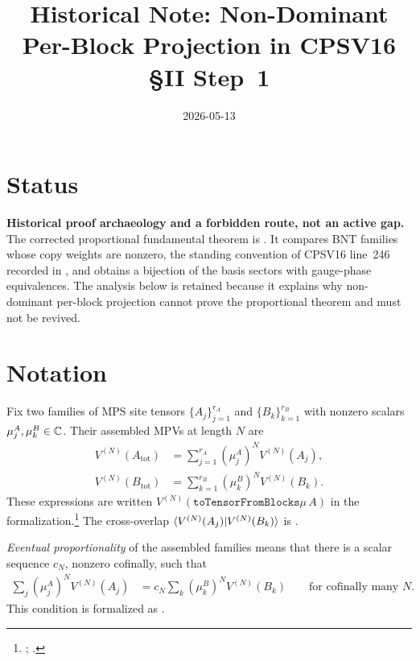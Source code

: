 \documentclass{article}
\title{Historical Note: Non-Dominant Per-Block Projection in CPSV16 \S II Step~1}
\author{}
\date{2026-05-13}
\begin{document}
\maketitle
{}

\section{Status}

\textbf{Historical proof archaeology and a forbidden route, not an active gap.}
The corrected proportional fundamental theorem is
. It compares
BNT families whose copy weights are nonzero, the standing convention of
CPSV16 line~246 recorded in
, and obtains a
bijection of the basis sectors with gauge-phase equivalences. The analysis
below is retained because it explains why non-dominant per-block projection
cannot prove the proportional theorem and must not be revived.

\section{Notation}

Fix two families of MPS site tensors $\{A_j\}_{j=1}^{r_A}$ and
$\{B_k\}_{k=1}^{r_B}$ with nonzero scalars
$\mu^A_j,\mu^B_k\in\mathbb{C}$. Their assembled MPVs at length $N$ are
\begin{align}
    V^{(N)}(A_{\mathrm{tot}})
        &=\sum_{j=1}^{r_A}(\mu^A_j)^N V^{(N)}(A_j),
    \label{eq:nondominant_A_assembled_mpv}\\
    V^{(N)}(B_{\mathrm{tot}})
        &=\sum_{k=1}^{r_B}(\mu^B_k)^N V^{(N)}(B_k).
    \label{eq:nondominant_B_assembled_mpv}
\end{align}
These expressions are written
$V^{(N)}(\mathtt{toTensorFromBlocks} \mu\,A)$ in the
formalization.\footnote{%
    ;
    .}
The cross-overlap
$\langle V^{(N)}(A_j) | V^{(N)}(B_k) \rangle$ is
.

\emph{Eventual proportionality} of the assembled families means that there is
a scalar sequence $c_N$, nonzero cofinally, such that
\begin{align}
    \sum_j(\mu^A_j)^N V^{(N)}(A_j)
        &=c_N\sum_k(\mu^B_k)^N V^{(N)}(B_k)
        \qquad\text{for cofinally many }N.
    \label{eq:nondominant_eventual_proportionality}
\end{align}
This condition is formalized as
.
\end{document}
